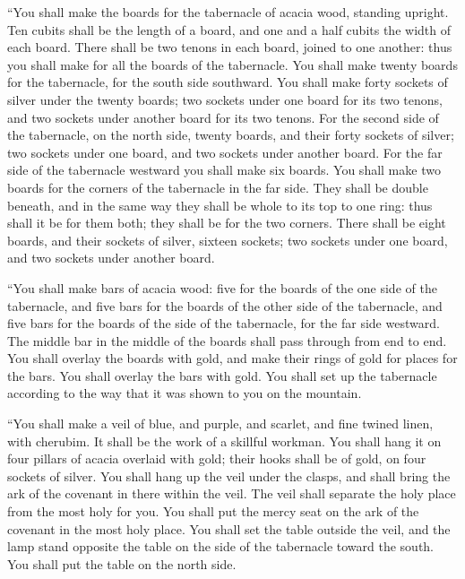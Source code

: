 \myverse{}“You shall make the boards for the tabernacle of acacia wood,
standing upright.
\myverse{}Ten cubits shall be the length of a board, and one and a half cubits the
width of each board.
\myverse{}There shall be two tenons in each board, joined to one another: thus you
shall make for all the boards of the tabernacle.
\myverse{}You shall make twenty boards for the tabernacle, for the south side southward.
\myverse{}You shall make forty sockets of silver under the twenty boards; two sockets
under one board for its two tenons, and two sockets under another board for its two tenons.
\myverse{}For the second side of the tabernacle, on the north side, twenty boards,
\myverse{}and their forty sockets of silver; two sockets under one board, and two sockets
under another board.
\myverse{}For the far side of the tabernacle westward you shall make six boards.
\myverse{}You shall make two boards for the corners of the tabernacle in the far side.
\myverse{}They shall be double beneath, and in the same way they shall be whole to
its top to one ring: thus shall it be for them both; they shall be for the two corners.
\myverse{}There shall be eight boards, and their sockets of silver, sixteen sockets;
two sockets under one board, and two sockets under another board.


\myverse{}“You shall make bars of acacia wood: five for the boards of
the one side of the tabernacle,
\myverse{}and five bars for the boards of the other side of the tabernacle, and five
bars for the boards of the side of the tabernacle, for the far side westward.
\myverse{}The middle bar in the middle of the boards shall pass through from end to
end.
\myverse{}You shall overlay the boards with gold, and make their rings of gold for
places for the bars. You shall overlay the bars with gold.
\myverse{}You shall set up the tabernacle according to the way that it was shown to
you on the mountain.


\myverse{}“You shall make a veil of blue, and purple, and scarlet, and
fine twined linen, with cherubim. It shall be the work of a skillful workman.
\myverse{}You shall hang it on four pillars of acacia overlaid with gold; their hooks
shall be of gold, on four sockets of silver.
\myverse{}You shall hang up the veil under the clasps, and shall bring the ark of the
covenant in there within the veil. The veil shall separate the holy place from the most holy for you.
\myverse{}You shall put the mercy seat on the ark of the covenant in the most holy
place.
\myverse{}You shall set the table outside the veil, and the lamp stand opposite the
table on the side of the tabernacle toward the south. You shall put the table on the north side.


